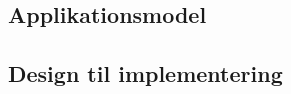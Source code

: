 \documentclass[../main.tex]{subfiles}
\begin{document}
\subsection{Applikationsmodel}


\subsection{Design til implementering}
 
 
 
\end{document}
